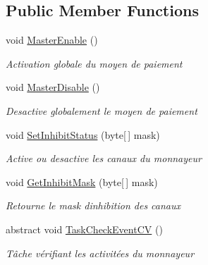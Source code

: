 \subsection*{Public Member Functions}
\begin{DoxyCompactItemize}
\item 
void \mbox{\hyperlink{class_device_library_1_1_ccash_reader_aec351cc4aeaf3fd814808de16bbc97f7}{Master\+Enable}} ()
\begin{DoxyCompactList}\small\item\em Activation globale du moyen de paiement \end{DoxyCompactList}\item 
void \mbox{\hyperlink{class_device_library_1_1_ccash_reader_acd4d9cf6f8ee0299f5521b6ff6fabc57}{Master\+Disable}} ()
\begin{DoxyCompactList}\small\item\em Desactive globalement le moyen de paiement \end{DoxyCompactList}\item 
void \mbox{\hyperlink{class_device_library_1_1_ccash_reader_ae336729983d06e5d15b9935a5d380417}{Set\+Inhibit\+Status}} (byte\mbox{[}$\,$\mbox{]} mask)
\begin{DoxyCompactList}\small\item\em Active ou desactive les canaux du monnayeur \end{DoxyCompactList}\item 
void \mbox{\hyperlink{class_device_library_1_1_ccash_reader_a22cc54c81546b8e13ca08d5981c791cf}{Get\+Inhibit\+Mask}} (byte\mbox{[}$\,$\mbox{]} mask)
\begin{DoxyCompactList}\small\item\em Retourne le mask d\textquotesingle{}inhibition des canaux \end{DoxyCompactList}\item 
abstract void \mbox{\hyperlink{class_device_library_1_1_ccash_reader_ab2ea8031995213b54aa9801f86f15315}{Task\+Check\+Event\+CV}} ()
\begin{DoxyCompactList}\small\item\em Tâche vérifiant les activitées du monnayeur \end{DoxyCompactList}\end{DoxyCompactItemize}

